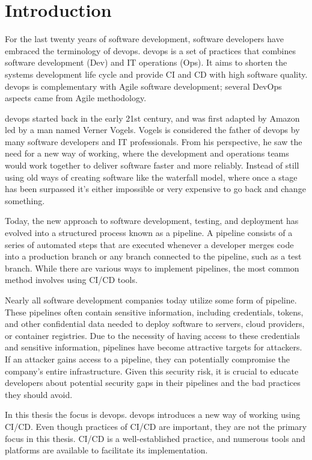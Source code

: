 \chapter{Introduction}
For the last twenty years of software development, software developers have embraced the terminology of \ac{devops}.
\ac{devops} is a set of practices that combines software development (Dev) and IT operations (Ops). 
It aims to shorten the systems development life cycle and provide \ac{CI} and \ac{CD} with high software quality. 
\ac{devops} is complementary with Agile software development; several DevOps aspects came from Agile methodology. 

\ac{devops} started back in the early 21st century, and was first adapted by Amazon led by a man named Verner Vogels.
Vogels is considered the father of \ac{devops} by many software developers and IT professionals. From his perspective, 
he saw the need for a new way of working, where the development and operations teams would work together to
deliver software faster and more reliably. Instead of still using old ways of creating software 
like the waterfall model, where once a stage has been surpassed it's either impossible or very expensive to go back and change something.
\cite{devops}

Today, the new approach to software development, testing, and deployment has evolved into a structured process known as a pipeline. 
A pipeline consists of a series of automated steps that are executed whenever a developer merges code into a production branch or any 
branch connected to the pipeline, such as a test branch. While there are various ways to implement pipelines, the most common method involves 
using \ac{CI/CD} tools.

Nearly all software development companies today utilize some form of pipeline. These pipelines often contain sensitive information, 
including credentials, tokens, and other confidential data needed to deploy software to servers, cloud providers, or container registries. 
Due to the necessity of having access to these credentials and sensitive information, pipelines have become attractive targets for attackers. 
If an attacker gains access to a pipeline, they can potentially compromise the company's entire infrastructure.
Given this security risk, it is crucial to educate developers about potential security gaps in their pipelines and the bad practices they should avoid. 

In this thesis the focus is \ac{devops}. \ac{devops} introduces a new way of working using 
\ac{CI/CD}. Even though practices of \ac{CI/CD} are important, they are not the primary focus in this thesis. 
\ac{CI/CD} is a well-established practice, and numerous tools and platforms are available to facilitate its implementation.


